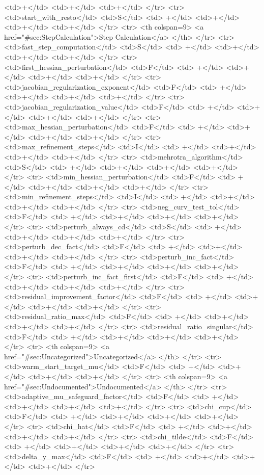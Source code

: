 {{<td>+</td>
<td>+</td>
<td>+</td>
</tr>
<tr>
<td>start_with_resto</td>
<td>S</td>
<td> +</td>
<td>+</td>
<td>+</td>
<td>+</td>
</tr>
<tr>   <th colspan=9> <a href="#sec:StepCalculation">Step Calculation</a> </th>
</tr>
<tr>
<td>fast_step_computation</td>
<td>S</td>
<td> +</td>
<td>+</td>
<td>+</td>
<td>+</td>
</tr>
<tr>
<td>first_hessian_perturbation</td>
<td>F</td>
<td> +</td>
<td>+</td>
<td>+</td>
<td>+</td>
</tr>
<tr>
<td>jacobian_regularization_exponent</td>
<td>F</td>
<td> +</td>
<td>+</td>
<td>+</td>
<td>+</td>
</tr>
<tr>
<td>jacobian_regularization_value</td>
<td>F</td>
<td> +</td>
<td>+</td>
<td>+</td>
<td>+</td>
</tr>
<tr>
<td>max_hessian_perturbation</td>
<td>F</td>
<td> +</td>
<td>+</td>
<td>+</td>
<td>+</td>
</tr>
<tr>
<td>max_refinement_steps</td>
<td>I</td>
<td> +</td>
<td>+</td>
<td>+</td>
<td>+</td>
</tr>
<tr>
<td>mehrotra_algorithm</td>
<td>S</td>
<td> +</td>
<td>+</td>
<td>+</td>
<td>+</td>
</tr>
<tr>
<td>min_hessian_perturbation</td>
<td>F</td>
<td> +</td>
<td>+</td>
<td>+</td>
<td>+</td>
</tr>
<tr>
<td>min_refinement_steps</td>
<td>I</td>
<td> +</td>
<td>+</td>
<td>+</td>
<td>+</td>
</tr>
<tr>
<td>neg_curv_test_tol</td>
<td>F</td>
<td> +</td>
<td>+</td>
<td>+</td>
<td>+</td>
</tr>
<tr>
<td>perturb_always_cd</td>
<td>S</td>
<td> +</td>
<td>+</td>
<td>+</td>
<td>+</td>
</tr>
<tr>
<td>perturb_dec_fact</td>
<td>F</td>
<td> +</td>
<td>+</td>
<td>+</td>
<td>+</td>
</tr>
<tr>
<td>perturb_inc_fact</td>
<td>F</td>
<td> +</td>
<td>+</td>
<td>+</td>
<td>+</td>
</tr>
<tr>
<td>perturb_inc_fact_first</td>
<td>F</td>
<td> +</td>
<td>+</td>
<td>+</td>
<td>+</td>
</tr>
<tr>
<td>residual_improvement_factor</td>
<td>F</td>
<td> +</td>
<td>+</td>
<td>+</td>
<td>+</td>
</tr>
<tr>
<td>residual_ratio_max</td>
<td>F</td>
<td> +</td>
<td>+</td>
<td>+</td>
<td>+</td>
</tr>
<tr>
<td>residual_ratio_singular</td>
<td>F</td>
<td> +</td>
<td>+</td>
<td>+</td>
<td>+</td>
</tr>
<tr>   <th colspan=9> <a href="#sec:Uncategorized">Uncategorized</a> </th>
</tr>
<tr>
<td>warm_start_target_mu</td>
<td>F</td>
<td> +</td>
<td>+</td>
<td>+</td>
<td>+</td>
</tr>
<tr>   <th colspan=9> <a href="#sec:Undocumented">Undocumented</a> </th>
</tr>
<tr>
<td>adaptive_mu_safeguard_factor</td>
<td>F</td>
<td> +</td>
<td>+</td>
<td>+</td>
<td>+</td>
</tr>
<tr>
<td>chi_cup</td>
<td>F</td>
<td> +</td>
<td>+</td>
<td>+</td>
<td>+</td>
</tr>
<tr>
<td>chi_hat</td>
<td>F</td>
<td> +</td>
<td>+</td>
<td>+</td>
<td>+</td>
</tr>
<tr>
<td>chi_tilde</td>
<td>F</td>
<td> +</td>
<td>+</td>
<td>+</td>
<td>+</td>
</tr>
<tr>
<td>delta_y_max</td>
<td>F</td>
<td> +</td>
<td>+</td>
<td>+</td>
<td>+</td>
</tr>
}}
